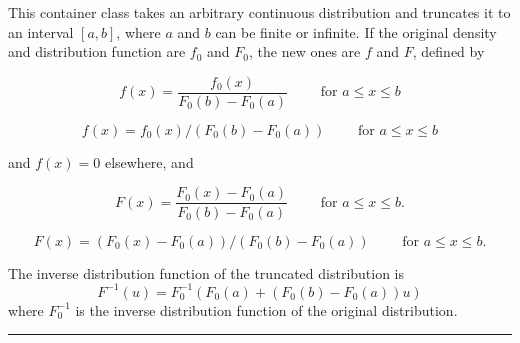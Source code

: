 
This container class takes an arbitrary continuous distribution and truncates
it to an interval $[a,b]$, where $a$ and $b$ can be finite or infinite.
If the original density and distribution function are $f_0$ and $F_0$,
the new ones are $f$ and $F$, defined by
\begin{latexonly}%
\[
  f(x) = \frac {f_0(x)}{F_0(b) - F_0(a)} \qquad\mbox { for } a\le x\le b
\]
\end{latexonly}
\begin{htmlonly}
\[
  f(x) =  f_0(x) / (F_0(b) - F_0(a)) \qquad\mbox { for } a\le x\le b
\]
\end{htmlonly}%
and $f(x)=0$ elsewhere, and
\begin{latexonly}%
\[
  F(x) = \frac {F_0(x)-F_0(a)}{F_0(b)-F_0(a)}  \qquad\mbox { for } a\le x\le b.
\]
\end{latexonly}
\begin{htmlonly}
\[
  F(x) = (F_0(x)-F_0(a))/(F_0(b)-F_0(a))  \qquad\mbox { for } a\le x\le b.
\]
\end{htmlonly}

The inverse distribution function of the truncated distribution is
\[
  {F^{-1}}(u) = F_0^{-1}(F_0(a) + (F_0(b) - F_0(a))u)
\]
where $F_0^{-1}$ is the inverse distribution function of the
original distribution.

\bigskip\hrule

